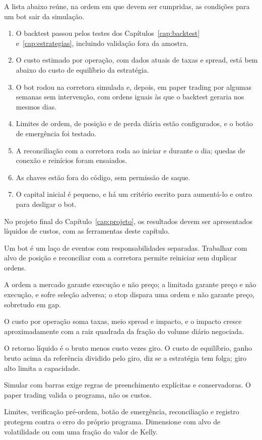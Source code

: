 A lista abaixo reúne, na ordem em que devem ser cumpridas, as condições para um bot sair da simulação.

\begin{enumerate}
  \item O backtest passou pelos testes dos Capítulos~\ref{cap:backtest} e~\ref{cap:estrategias}, incluindo validação fora da amostra.
  \item O custo estimado por operação, com dados atuais de taxas e spread, está bem abaixo do custo de equilíbrio da estratégia.
  \item O bot rodou na corretora simulada e, depois, em paper trading por algumas semanas sem intervenção, com ordens iguais às que o backtest geraria nos mesmos dias.
  \item Limites de ordem, de posição e de perda diária estão configurados, e o botão de emergência foi testado.
  \item A reconciliação com a corretora roda ao iniciar e durante o dia; quedas de conexão e reinícios foram ensaiados.
  \item As chaves estão fora do código, sem permissão de saque.
  \item O capital inicial é pequeno, e há um critério escrito para aumentá-lo e outro para desligar o bot.
\end{enumerate}

No projeto final do Capítulo~\ref{cap:projeto}, os resultados devem ser apresentados líquidos de custos, com as ferramentas deste capítulo.

\begin{resumo}
  \item Um bot é um laço de eventos com responsabilidades separadas. Trabalhar com alvo de posição e reconciliar com a corretora permite reiniciar sem duplicar ordens.
  \item A ordem a mercado garante execução e não preço; a limitada garante preço e não execução, e sofre seleção adversa; o stop dispara uma ordem e não garante preço, sobretudo em gap.
  \item O custo por operação soma taxas, meio spread e impacto, e o impacto cresce aproximadamente com a raiz quadrada da fração do volume diário negociada.
  \item O retorno líquido é o bruto menos custo vezes giro. O custo de equilíbrio, ganho bruto acima da referência dividido pelo giro, diz se a estratégia tem folga; giro alto limita a capacidade.
  \item Simular com barras exige regras de preenchimento explícitas e conservadoras. O paper trading valida o programa, não os custos.
  \item Limites, verificação pré-ordem, botão de emergência, reconciliação e registro protegem contra o erro do próprio programa. Dimensione com alvo de volatilidade ou com uma fração do valor de Kelly.
\end{resumo}

